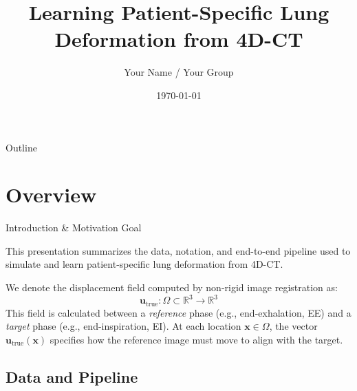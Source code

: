 \documentclass{beamer}
\title{Learning Patient-Specific Lung Deformation from 4D-CT}
\author{Your Name / Your Group}
\institute{Your Institution}
\date{\today}
\begin{document}
\begin{frame}
  \titlepage
\end{frame}

\begin{frame}{Outline}
  \tableofcontents
\end{frame}

\section{Overview}

\begin{frame}[fragile]{Introduction \& Motivation}
Goal

        This presentation summarizes the data, notation, and end-to-end pipeline used to simulate and learn patient-specific lung deformation from 4D-CT.
    
        We denote the displacement field computed by non-rigid image registration as:
        \[
          \mathbf{u}_{\mathrm{true}} \colon \Omega \subset \mathbb{R}^3 \to \mathbb{R}^3
        \]
        This field is calculated between a \emph{reference} phase (e.g., end-exhalation, EE) and a \emph{target} phase (e.g., end-inspiration, EI).
        \newline\vspace{0.5cm}
        At each location $\mathbf{x}\in\Omega$, the vector $\mathbf{u}_{\mathrm{true}}(\mathbf{x})$ specifies how the reference image must move to align with the target.
    
\end{frame}

\subsection{Data and Pipeline}
\end{document}
